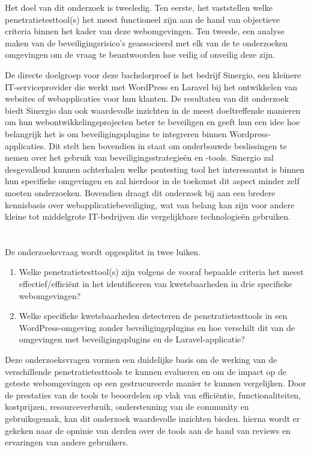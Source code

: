 Het doel van dit onderzoek is tweeledig. 
Ten eerste, het vaststellen welke penetratietesttool(s) het meest functioneel zijn aan de hand van objectieve criteria binnen het kader van deze webomgevingen. Ten tweede, 
een analyse maken van de beveiligingsrisico's geassocieerd met elk van de te onderzoeken omgevingen om de vraag te beantwoorden hoe 
veilig of onveilig deze zijn.

De directe doelgroep voor deze bachelorproef is het bedrijf Sinergio, een kleinere IT-serviceprovider die  
werkt met WordPress en Laravel bij het ontwikkelen van websites of webapplicaties voor hun klanten. De resultaten van dit 
onderzoek biedt Sinergio dan ook waardevolle inzichten in de meest doeltreffende manieren om hun webontwikkelingsprojecten beter 
te beveiligen en geeft hun een idee hoe belangrijk het is om beveiligingsplugins te integreren binnen Wordpress-applicaties. 
Dit stelt hen bovendien in staat om onderbouwde beslissingen te nemen over het gebruik van 
beveiligingsstrategieën en -tools. Sinergio zal desgevallend kunnen achterhalen welke pentesting tool het interessantst is 
binnen hun specifieke omgevingen en zal hierdoor in de toekomst dit aspect minder zelf moeten onderzoeken.
Bovendien draagt dit onderzoek bij aan een bredere kennisbasis over webapplicatiebeveiliging, 
wat van belang kan zijn voor andere kleine tot middelgrote IT-bedrijven die vergelijkbare technologieën gebruiken.

\section{}%
\label{sec:onderzoeksvraag}
De onderzoeksvraag wordt opgesplitst in twee luiken.
\begin{enumerate}
  \item Welke penetratietesttool(s) zijn volgens de vooraf bepaalde criteria het meest effectief/efficiënt in het identificeren van kwetsbaarheden in drie specifieke webomgevingen?
  \item Welke specifieke kwetsbaarheden detecteren de penetratietesttools in een WordPress-omgeving zonder beveiligingsplugins en hoe verschilt dit van de omgevingen met beveiligingsplugins en de Laravel-applicatie? 
\end{enumerate}
Deze onderzoeksvragen vormen een duidelijke basis om de werking van de verschillende penetratietesttools te kunnen evalueren 
en om de impact op de geteste webomgevingen op een gestrucureerde manier te kunnen vergelijken. Door de prestaties van de 
tools te beoordelen op vlak van efficiëntie, functionaliteiten, kostprijzen, resourceverbruik, ondersteuning van de community en gebruiksgemak, 
kan dit onderzoek waardevolle inzichten bieden. hierna wordt er gekeken naar de opninie van derden over de tools aan de hand van 
reviews en ervaringen van andere gebruikers.

